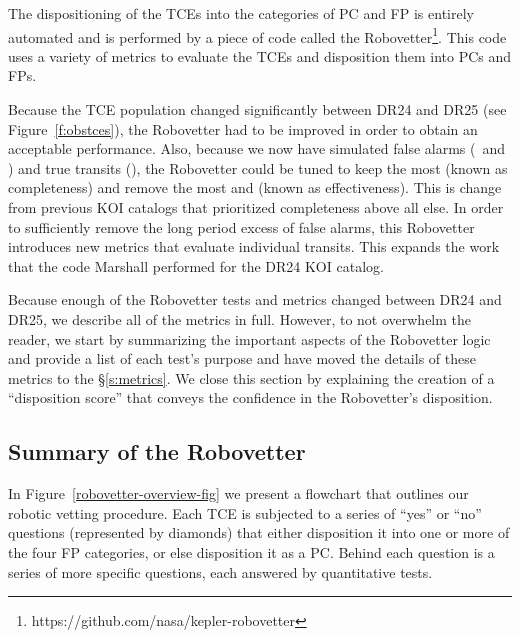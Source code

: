 \label{s:robovetter}
The dispositioning of the TCEs into the categories of PC and FP is entirely automated and is performed by a piece of code called the Robovetter\footnote{https://github.com/nasa/kepler-robovetter}. This code uses a variety of metrics to evaluate the TCEs and disposition them into PCs and FPs.  


Because the TCE population changed significantly between DR24 and DR25 (see Figure~\ref{f:obstces}), the Robovetter had to be improved in order to obtain an acceptable performance.  Also, because we now have simulated false alarms (\invtce\ and \scrtce) and true transits (\injtce), the Robovetter could be tuned to keep the most  (known as completeness) and remove the most  and  (known as effectiveness). This is change from previous KOI catalogs that prioritized completeness above all else.  In order to sufficiently remove the long period excess of false alarms, this Robovetter introduces new metrics that evaluate individual transits. This expands the work that the code Marshall \citep{Mullally2015c} performed for the DR24 KOI catalog.

Because enough of the Robovetter tests and metrics changed between DR24 and DR25, we describe all of the metrics in full.  However, to not overwhelm the reader, we start by summarizing the important aspects of the Robovetter logic and provide a list of each test's purpose and have moved the details of these metrics to the \S\ref{s:metrics}. We close this section by explaining the creation of a ``disposition score'' that conveys the confidence in the Robovetter's disposition.


\subsection{Summary of the Robovetter}

\noindent In Figure~\ref{robovetter-overview-fig} we present a flowchart that outlines our robotic vetting procedure. Each TCE is subjected to a series of ``yes'' or ``no'' questions (represented by diamonds) that either disposition it into one or more of the four FP categories, or else disposition it as a PC. Behind each question is a series of more specific questions, each answered by quantitative tests. 


